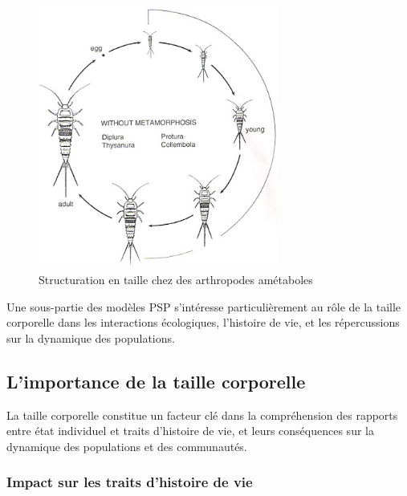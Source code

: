 \begin{figure}[H]
\centering
\includegraphics[width=0.7\textwidth]{1_CorpsDeThese/EA/Fig/bugs1}
\caption[Structuration en taille chez des
arthropodes amétaboles]{Structuration en taille chez des arthropodes amétaboles}\label{fig:taille}
\end{figure}

Une sous-partie des modèles PSP s'intéresse particulièrement au rôle de la
taille corporelle dans les interactions écologiques, l'histoire de vie, et les
répercussions sur la dynamique des populations. 

\subsection{L'importance de la taille corporelle}

La taille corporelle constitue un facteur clé dans la compréhension des rapports
entre état individuel et traits d'histoire de vie, et leurs conséquences sur la
dynamique des populations et des communautés. 

\subsubsection{Impact sur les traits d'histoire de vie}

